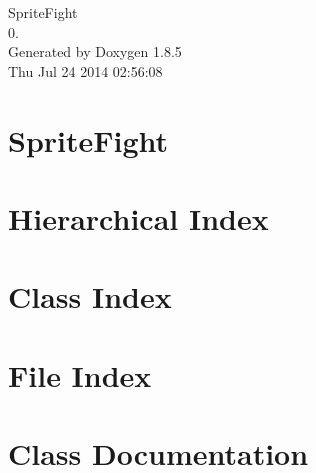 \documentclass[twoside]{book}
\newcommand{\clearemptydoublepage}{%
  \newpage{\pagestyle{empty}\cleardoublepage}%
}
\begin{document}
\hypersetup{pageanchor=false}
\begin{titlepage}
\vspace*{7cm}
\begin{center}%
{\Large Sprite\-Fight \\[1ex]\large 0. }\\
\vspace*{1cm}
{\large Generated by Doxygen 1.8.5}\\
\vspace*{0.5cm}
{\small Thu Jul 24 2014 02:56:08}\\
\end{center}
\end{titlepage}
\clearemptydoublepage
\tableofcontents
\clearemptydoublepage
{}
\hypersetup{pageanchor=true}

\chapter{Sprite\-Fight}
\label{md___volumes__o_s__x__h_d_d__users__adam__developer__sprite_fight__r_e_a_d_m_e}
\hypertarget{md___volumes__o_s__x__h_d_d__users__adam__developer__sprite_fight__r_e_a_d_m_e}{}

\chapter{Hierarchical Index}

\chapter{Class Index}

\chapter{File Index}

\chapter{Class Documentation}















































\end{document}
